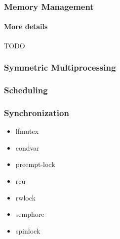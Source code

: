 \documentclass[10pt]{beamer}
\begin{document}
\begin{frame}
	\frametitle{Memory Management}
	\framesubtitle{More details}
		
\center
TODO

\end{frame}


\begin{frame}
	\frametitle{Symmetric Multiprocessing}
  
	\center
	\TODO
	
\end{frame}



\begin{frame}
	\frametitle{Scheduling}
	
	\center
	\TODO

\end{frame}



\begin{frame}
	\frametitle{Synchronization}
	\begin{itemize}
		\item lfmutex
		\item condvar
		\item preempt-lock
		\item rcu
		\item rwlock
		\item semphore
		\item spinlock
	\end{itemize}
\end{frame}
\end{document}
